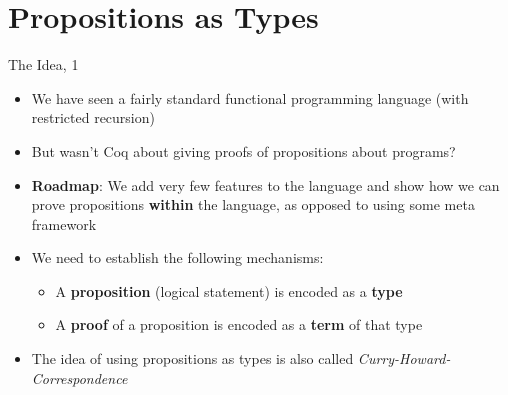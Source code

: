 
\section{Propositions as Types}

\begin{frame}{The Idea, 1}
\begin{itemize}
  \item We have seen a fairly standard functional programming language (with restricted recursion)

  \pause

  \item But wasn't Coq about giving proofs of propositions about programs?

  \pause

  \item \textbf{Roadmap}: We add very few features to the language and show how we can prove propositions \textbf{within} the language, as opposed to using some meta framework

  \pause

  \item We need to establish the following mechanisms:
  \begin{itemize}
    \item A \textbf{proposition} (logical statement) is encoded as a \textbf{type}
    \item A \textbf{proof} of a proposition is encoded as a \textbf{term} of that type
  \end{itemize}

  \pause

  \item The idea of using propositions as types is also called \textit{Curry-Howard-Correspondence}
\end{itemize}
\end{frame}

